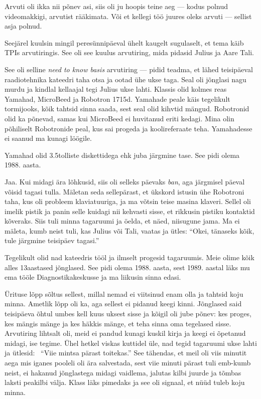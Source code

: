 Arvuti oli ikka nii põnev asi, siis oli ju hoopis teine aeg --- kodus polnud 
videomakkigi, arvutist rääkimata. Või et kellegi töö juures oleks arvuti --- 
sellist asja polnud. 

Seejärel kuulsin mingil peresünnipäeval
ühelt kaugelt sugulaselt, et tema käib TPIs 
arvutiringis. See oli see kuulus 
arvutiring, mida pidasid Julius ja Aare Tali. 

See oli selline \emph{need to know 
basis} arvutiring --- pidid teadma, et lähed teisipäeval raadiotehnika 
kateedri taha otsa ja 
ootad ühe ukse taga. Seal oli jõnglasi nagu murdu ja 
kindlal kellaajal tegi Julius ukse lahti. Klassis olid kolmes reas
Yamahad, MicroBeed ja 
Robotron 1715d. Yamahade peale käis 
tegelikult tormijooks, kõik tahtsid sinna saada, sest seal olid 
kihvtid mängud. Robotronid olid ka põnevad, samas kui MicroBeed ei huvitanud eriti kedagi. Mina olin põhiliselt Robotronide peal, kus sai 
progeda ja koolireferaate teha. Yamahadesse ei saanud ma
kunagi löögile. 

Yamahad olid 3.5tolliste diskettidega ehk juba järgmine tase. See pidi olema 1988. aasta.


Jaa. Kui midagi ära lõhkusid, siis oli selleks päevaks \emph{ban}, aga järgmisel 
päeval võisid tagasi tulla. Mäletan seda sellepärast, et ükskord istusin 
ühe Robotroni taha, kus oli probleem klaviatuuriga, ja ma võtsin teise 
masina klaveri. Sellel oli imelik pistik ja panin selle kuidagi nii kehvasti sisse, et rikkusin pistiku kontaktid kõveraks. Siis tuli minna tagaruumi 
ja öelda, et näed, niisugune jama. Ma ei mäleta, kumb neist tuli, kas Julius 
või Tali, vaatas ja ütles: \enquote{Okei, tänaseks kõik, tule järgmine 
teisipäev tagasi.} 

Tegelikult olid nad kateedris tööl ja ilmselt progesid tagaruumis. Meie 
olime kõik alles 13aastased jõnglased. 
See pidi olema 1988. aasta, sest 1989. aastal läks mu ema tööle 
Diagnostikakeskusse ja 
ma liikusin sinna edasi. 

Ürituse lõpp sõltus sellest, millal nemad ei viitsinud enam olla ja tahtsid 
koju minna. Ametlik lõpp oli ka, aga sellest ei pidanud keegi 
kinni. Jõnglased said teisipäeva õhtul umbes kell kuus uksest sisse ja kõigil oli jube 
põnev: kes proges, kes mängis mänge ja kes häkkis mänge, et teha 
sinna oma tegelased sisse. Arvutiring lihtsalt oli, meid ei pandud 
kunagi kuskil kirja ja keegi ei õpetanud midagi, ise tegime. Ühel hetkel 
viskas kuttidel üle, nad tegid tagaruumi ukse lahti ja ütlesid: 
\enquote{Viie mintsa pärast toitekas.} See tähendas, et meil oli viis minutit aega mis 
iganes pooleli oli ära salvestada, sest viie minuti pärast tuli emb-kumb neist, ei hakanud jõnglastega midagi vaidlema, jalutas kilbi juurde ja 
tõmbas laksti peakilbi välja. Klass läks pimedaks ja see oli signaal, et nüüd tuleb koju 
minna.

